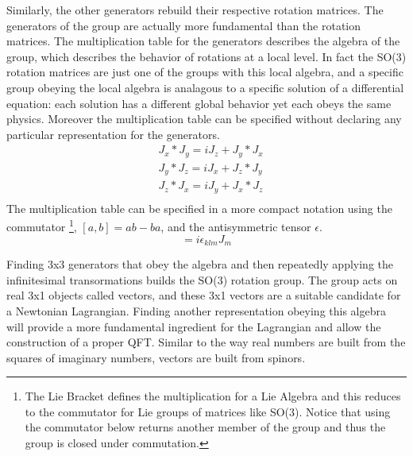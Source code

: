 Similarly, the other generators rebuild their respective rotation matrices. The generators of the group are actually more fundamental than the rotation matrices. The multiplication table for the generators describes the algebra of the group, which describes the behavior of rotations at a local level. In fact the SO(3) rotation matrices are just one of the groups with this local algebra, and a specific group obeying the local algebra is analagous to a specific solution of a differential equation: each solution has a different global behavior yet each obeys the same physics. Moreover the multiplication table can be specified without declaring any particular representation for the generators. 
\begin{equation}
\begin{split}
&J_x*J_y = iJ_z  + J_y*J_x \\
&J_y*J_z = iJ_x  + J_z*J_y \\
&J_z*J_x = iJ_y  + J_x*J_z \\
\end{split}
\end{equation}
The multiplication table can be specified in a more compact notation using the commutator \footnote{The Lie Bracket defines the multiplication for a Lie Algebra and this reduces to the commutator for Lie groups of matrices like SO(3). Notice that using the commutator below returns another member of the group and thus the group is closed under commutation.}, $[a,b] = ab - ba$, and the antisymmetric tensor $\epsilon$.
\begin{equation}
[J_k, J_l] = i\epsilon_{klm}J_m
\end{equation}

Finding 3x3 generators that obey the algebra and then repeatedly applying the infinitesimal transormations builds the SO(3) rotation group. The group acts on real 3x1 objects called vectors, and these 3x1 vectors are a suitable candidate for a Newtonian Lagrangian. Finding another representation obeying this algebra will provide a more fundamental ingredient for the Lagrangian and allow the construction of a proper QFT. Similar to the way real numbers are built from the squares of imaginary numbers, vectors are built from spinors. 

